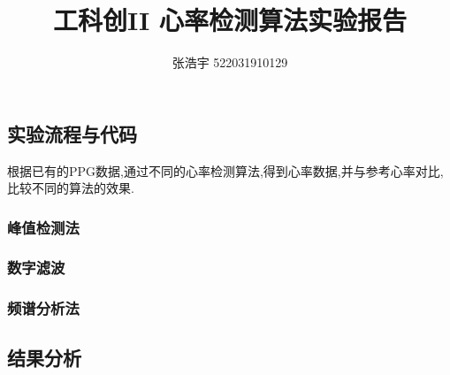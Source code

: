 \documentclass[12pt, a4paper, oneside]{ctexart}
\title{\textbf{工科创II 心率检测算法实验报告}}
\author{张浩宇 522031910129}
\date{}
\begin{document}
    \maketitle
    \subsection{实验流程与代码}
    根据已有的PPG数据,通过不同的心率检测算法,得到心率数据,并与参考心率对比,比较不同的算法的效果.
    \subsubsection{峰值检测法}
    \subsubsection{数字滤波}
    \subsubsection{频谱分析法}
    \subsection{结果分析}
\end{document}
